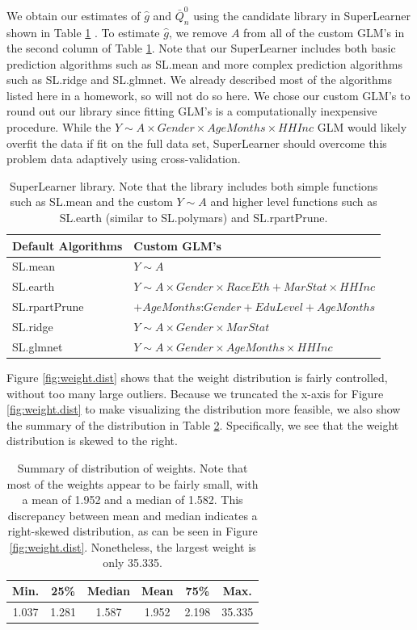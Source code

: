 \documentclass{article}
\begin{document}
We obtain our estimates of $\hat{g}$ and $\bar{Q}_n^0$ using the candidate library in SuperLearner shown in Table \ref{tab:sl.lib} \cite{superlearner}. To estimate $\hat{g}$, we remove $A$ from all of the custom GLM's in the second column of Table \ref{tab:sl.lib}. Note that our SuperLearner includes both basic prediction algorithms such as SL.mean and more complex prediction algorithms such as SL.ridge and SL.glmnet. We already described most of the algorithms listed here in a homework, so will not do so here. We chose our custom GLM's to round out our library since fitting GLM's is a computationally inexpensive procedure. While the $Y \sim A \times Gender \times AgeMonths \times HHInc$ GLM would likely overfit the data if fit on the full data set, SuperLearner should overcome this problem data adaptively using cross-validation.
\begin{table}[h!]
\begin{tabular}{l | l}
Default Algorithms & Custom GLM's \\
\hline
SL.mean & $Y \sim A$ \\
SL.earth & $Y \sim A \times Gender \times RaceEth + MarStat \times HHInc$ \\
SL.rpartPrune & $+ AgeMonths$:$Gender + EduLevel + AgeMonths $ \\
SL.ridge & $Y \sim A \times Gender \times MarStat$ \\
SL.glmnet &  $Y \sim A \times Gender \times AgeMonths \times HHInc$ \\
\end{tabular}
\caption{SuperLearner library. Note that the library includes both simple functions such as SL.mean and the custom $Y\sim A$ and higher level functions such as SL.earth (similar to SL.polymars) and SL.rpartPrune.}
\label{tab:sl.lib}
\end{table}

Figure \ref{fig:weight.dist} shows that the weight distribution is fairly controlled, without too many large outliers. Because we truncated the x-axis for Figure \ref{fig:weight.dist} to make visualizing the distribution more feasible, we also show the summary of the distribution in Table \ref{tab:weight.summary}. Specifically, we see that the weight distribution is skewed to the right.

\begin{table}
\centering
\begin{tabular}{cccccc}
  \hline
 Min. & 25\% & Median & Mean & 75\% & Max. \\ 
  \hline
 1.037   & 1.281   & 1.587   & 1.952   &  2.198   &  35.335   \\ 
   \hline
\end{tabular}
\caption{Summary of distribution of weights. Note that most of the weights appear to be fairly small, with a mean of 1.952 and a median of 1.582. This discrepancy between mean and median indicates a right-skewed distribution, as can be seen in Figure \ref{fig:weight.dist}. Nonetheless, the largest weight is only 35.335.}
\label{tab:weight.summary}
\end{table}
\end{document}
